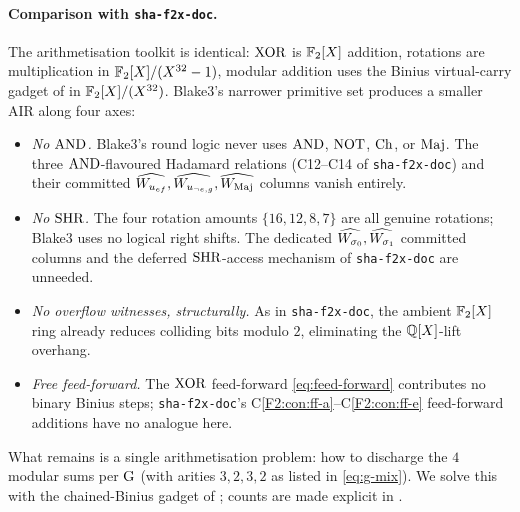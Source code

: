 \paragraph{Comparison with \texttt{sha-f2x-doc}.}
The arithmetisation toolkit is identical: $\operatorname{XOR}$ is $\mathbb{F}_2[X]$
addition, rotations are multiplication in $\mathbb{F}_2[X]/(X^{32}-1)$, modular addition
uses the Binius virtual-carry gadget of
 in $\mathbb{F}_2[X]/(X^{32})$. Blake3's narrower primitive
set produces a smaller AIR along four axes:
\begin{itemize}[leftmargin=2em,topsep=2pt]
  \item \emph{No $\operatorname{AND}$.} Blake3's round logic never uses $\operatorname{AND}$,
        $\operatorname{NOT}$, $\operatorname{Ch}$, or $\operatorname{Maj}$. The three $\operatorname{AND}$-flavoured Hadamard
        relations (C12--C14 of \texttt{sha-f2x-doc}) and their
        committed $\widehat{W_{u_{ef}}}, \widehat{W_{u_{\neg e, g}}},
        \widehat{W_{\operatorname{Maj}}}$ columns vanish entirely.
  \item \emph{No $\operatorname{SHR}$.} The four rotation amounts $\{16, 12, 8, 7\}$
        are all genuine rotations; Blake3 uses no logical right shifts.
        The dedicated $\widehat{W_{\sigma_0}}, \widehat{W_{\sigma_1}}$ committed
        columns and the deferred $\operatorname{SHR}$-access mechanism of
        \texttt{sha-f2x-doc} are unneeded.
  \item \emph{No overflow witnesses, structurally.} As in
        \texttt{sha-f2x-doc}, the ambient $\mathbb{F}_2[X]$ ring already
        reduces colliding bits modulo $2$, eliminating the
        $\mathbb{Q}[X]$-lift overhang.
  \item \emph{Free feed-forward.} The $\operatorname{XOR}$ feed-forward
        \eqref{eq:feed-forward} contributes no binary Binius steps;
        \texttt{sha-f2x-doc}'s C\ref{F2:con:ff-a}--C\ref{F2:con:ff-e}
        feed-forward additions have no analogue here.
\end{itemize}
What remains is a single arithmetisation problem: how to discharge the
$4$ modular sums per $\operatorname{G}$ (with arities $3, 2, 3, 2$ as listed in
\eqref{eq:g-mix}). We solve this with the chained-Binius gadget of
; counts are made explicit in
.
